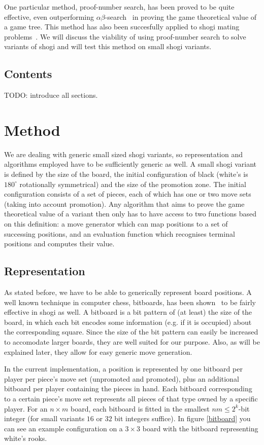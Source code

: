 \documentclass{article}
\begin{document}
One particular method, proof-number search, has been proved to be quite effective, even outperforming $\alpha\beta$-search~\cite{van2008proof} in
proving the game theoretical value of a game tree. This method has also been succesfully applied to shogi mating
problems~\cite{seo2001pn, ueda2008weak, sakuta2001performance}. We will discuss the viability of using proof-number search to solve variants of shogi and will test
this method on small shogi variants.

\subsection{Contents}
TODO: introduce all sections.

\section{Method}
We are dealing with generic small sized shogi variants, so representation and algorithms employed have to be sufficiently generic as well.
A small shogi variant is defined by the size of the board, the initial configuration of black (white's is $180^{\circ}$ rotationally symmetrical) and
the size of the promotion zone. The initial configuration consists of a set of pieces, each of which has one or two move sets (taking into account
promotion). Any algorithm that aims to prove the game theoretical value of a variant then only has to have access to two functions based on this
definition: a move generator which can map positions to a set of successing positions, and an evaluation function which recognises terminal
positions and computes their value.

\subsection{Representation}
As stated before, we have to be able to generically represent board positions. A well known technique in computer chess, bitboards, has been
shown~\cite{grimbergen2007using} to be fairly effective in shogi as well. A bitboard is a bit pattern of (at least) the size of the board,
in which each bit encodes some information (e.g. if it is occupied) about the corresponding square. Since the size of the bit pattern can
easily be increased to accomodate larger boards, they are well suited for our purpose. Also, as will be explained later, they allow for easy
generic move generation.

In the current implementation, a position is represented by one bitboard per player per piece's move set (unpromoted and promoted), plus an additional
bitboard per player containing the pieces in hand. Each bitboard corresponding to a certain piece's move set represents all pieces of that type
owned by a specific player. For an $n \times m$ board, each bitboard is fitted in the smallest $nm \leq 2^k$-bit integer (for small
variants $16$ or $32$ bit integers suffice). In figure \ref{bitboard} you can see an example configuration on a $3 \times 3$ board with the
bitboard representing white's rooks.
\end{document}
